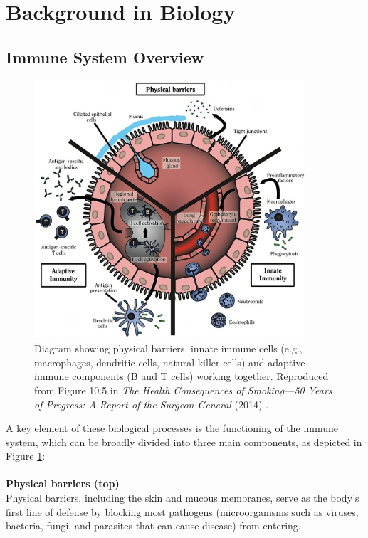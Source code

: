 \documentclass[12pt,a4paper]{report}
\begin{document}
\section{Background in Biology}

\subsection{Immune System Overview}

\begin{figure}[h]
  \centering
  \includegraphics[width=0.9\textwidth]{images/Diagram_of_innate_and_adaptive_immunity.jpeg}
  \caption[Diagram of Innate and Adaptive Immunity]{Diagram showing physical barriers, innate immune cells (e.g., macrophages, dendritic cells, natural killer cells) and adaptive immune components (B and T cells) working together. Reproduced from Figure 10.5 in \emph{The Health Consequences of Smoking—50 Years of Progress: A Report of the Surgeon General} (2014) \cite{smoking2014}.}
  \label{fig:immunity}
\end{figure}
A key element of these biological processes is the functioning of the immune system, which can be broadly divided into three main components, as depicted in Figure \ref{fig:immunity}:\\
\\
\textbf{Physical barriers (top)}\\
Physical barriers, including the skin and mucous membranes, serve as the body’s first line of defense by blocking most pathogens (microorganisms such as viruses, bacteria, fungi, and parasites that can cause disease) from entering.\\
\end{document}
